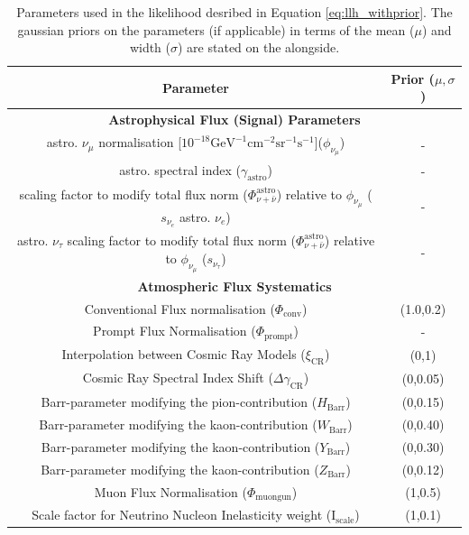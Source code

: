 \begin{table}[h]
    \caption[The description of the parameters used in the likelihood fit, along with priors (if used)]{Parameters used in the likelihood desribed in Equation \ref{eq:llh_withprior}. The gaussian priors on the parameters (if applicable) in terms of the mean ($\mu$) and width ($\sigma$) are stated on the alongside.}
    
    \begin{tabular}{ |c |c|}
        \hline
        Parameter & Prior ($\mu,\sigma$)\\
        \hline
        \hline
        \multicolumn{2}{c}{\textbf{Astrophysical Flux (Signal) Parameters}}\\
        \hline
        astro. $\nu_{\mu}$ normalisation [$10^{-18} \mathrm{GeV}^{-1}\mathrm{cm}^{-2}\mathrm{sr}^{-1}\mathrm{s}^{-1}$]($\phi_{\nu_{\mu}}$) & - \\
        astro. spectral index ($\gamma_{\mathrm{astro}}$) & -\\
        scaling factor to modify total flux norm ($\Phi_{\nu+\bar\nu}^{\mathrm{astro}}$) relative to $\phi_{\nu_{\mu}}$ ($s_{\nu_e}$ astro. $\nu_{e}$)&- \\
        astro. $\nu_{\tau}$ scaling factor to modify total flux norm ($\Phi_{\nu+\bar\nu}^{\mathrm{astro}}$) relative to $\phi_{\nu_{\mu}}$ ($s_{\nu_{\tau}}$) & -\\
        \hline
        \multicolumn{2}{c}{\textbf{Atmospheric Flux Systematics}}\\
        \hline
        Conventional Flux normalisation ($\Phi_{\mathrm{conv}}$)  & (1.0,0.2)\\
        Prompt Flux Normalisation ($\Phi_{\mathrm{prompt}}$) &  - \\
        Interpolation between Cosmic Ray Models ($\xi_{\mathrm{CR}}$)  & (0,1)\\
        Cosmic Ray Spectral Index Shift ($\Delta\gamma_{\mathrm{CR}}$) &  (0,0.05)\\
        Barr-parameter modifying the pion-contribution ($H_{\mathrm{Barr}}$) & (0,0.15)\\
        Barr-parameter modifying the kaon-contribution ($W_{\mathrm{Barr}}$) & (0,0.40)\\
        Barr-parameter modifying the kaon-contribution ($Y_{\mathrm{Barr}}$)& (0,0.30)\\
        Barr-parameter modifying the kaon-contribution ($Z_{\mathrm{Barr}}$) & (0,0.12)\\
        Muon Flux Normalisation ($\Phi_{\mathrm{muongun}}$)  & (1,0.5)\\
        Scale factor for Neutrino Nucleon Inelasticity weight ($\mathrm{I}_{\mathrm{scale}}$) & (1,0.1)\\
        \hline
        

\end{tabular}
\end{table}
